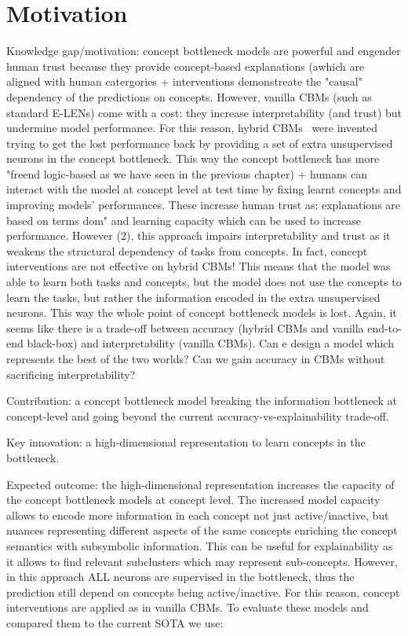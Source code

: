 \documentclass[withindex,glossary]{cam-thesis}
\begin{document}
\section{Motivation}
Knowledge gap/motivation: concept bottleneck models are powerful and engender human trust because they provide concept-based explanations (awhich are aligned with human catergories + interventions demonstreate the "causal" dependency of the predictions on concepts. However, vanilla CBMs (such as standard E-LENs) come with a cost: they increase interpretability (and trust) but undermine model performance. For this reason, hybrid CBMs~\citep{mahinpei2021promises} were invented trying to get the lost performance back by providing a set of extra unsupervised neurons in the concept bottleneck. This way the concept bottleneck has more "freend logic-based as we have seen in the previous chapter) + humans can interact with the model at concept level at test time by fixing learnt concepts and improving models' performances. These increase human trust as: explanations are based on terms dom" and learning capacity which can be used to increase performance. However (2), this approach impairs interpretability and trust as it weakens the structural dependency of tasks from concepts. In fact, concept interventions are not effective on hybrid CBMs! This means that the model was able to learn both tasks and concepts, but the model does not use the concepts to learn the tasks, but rather the information encoded in the extra unsupervised neurons. This way the whole point of concept bottleneck models is lost. Again, it seems like there is a trade-off between accuracy (hybrid CBMs and vanilla end-to-end black-box) and interpretability (vanilla CBMs). Can e design a model which represents the best of the two worlds? Can we gain accuracy in CBMs without sacrificing interpretability?


Contribution: a concept bottleneck model breaking the information bottleneck at concept-level and going beyond the current accuracy-vs-explainability trade-off.

Key innovation: a high-dimensional representation to learn concepts in the bottleneck.

Expected outcome: the high-dimensional representation increases the capacity of the concept bottleneck models at concept level. The increased model capacity allows to encode more information in each concept not just active/inactive, but nuances representing different aspects of the same concepts enriching the concept semantics with subsymbolic information. This can be useful for explainability as it allows to find relevant subclusters which may represent sub-concepts. However, in this approach ALL neurons are supervised in the bottleneck, thus the prediction still depend on concepts being active/inactive. For this reason, concept interventions are applied as in vanilla CBMs. To evaluate these models and compared them to the current SOTA we use:
\end{document}
